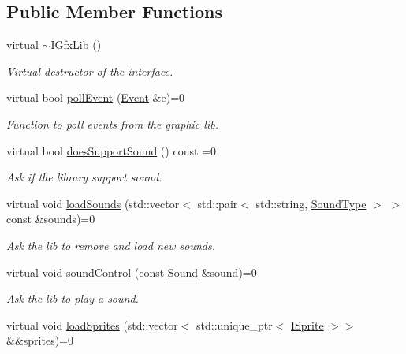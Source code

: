 \subsection*{Public Member Functions}
\begin{DoxyCompactItemize}
\item 
virtual \hyperlink{classarcade_1_1_i_gfx_lib_a1dc0971c862d69be60af1d3b82960c77}{$\sim$\+I\+Gfx\+Lib} ()
\begin{DoxyCompactList}\small\item\em Virtual destructor of the interface. \end{DoxyCompactList}\item 
virtual bool \hyperlink{classarcade_1_1_i_gfx_lib_a82cdd82f168ca898ef81edf82ca6147a}{poll\+Event} (\hyperlink{structarcade_1_1_event}{Event} \&e)=0
\begin{DoxyCompactList}\small\item\em Function to poll events from the graphic lib. \end{DoxyCompactList}\item 
virtual bool \hyperlink{classarcade_1_1_i_gfx_lib_a68cfbc987dfecca5b1405e36e00157b2}{does\+Support\+Sound} () const =0
\begin{DoxyCompactList}\small\item\em Ask if the library support sound. \end{DoxyCompactList}\item 
virtual void \hyperlink{classarcade_1_1_i_gfx_lib_a725faf0722d284d15eb389b0a1891a27}{load\+Sounds} (std\+::vector$<$ std\+::pair$<$ std\+::string, \hyperlink{namespacearcade_a3bb4743a2eea59f3927e404e6549cae5}{Sound\+Type} $>$ $>$ const \&sounds)=0
\begin{DoxyCompactList}\small\item\em Ask the lib to remove and load new sounds. \end{DoxyCompactList}\item 
virtual void \hyperlink{classarcade_1_1_i_gfx_lib_a0b965ed555739ef366b27583799d794c}{sound\+Control} (const \hyperlink{structarcade_1_1_sound}{Sound} \&sound)=0
\begin{DoxyCompactList}\small\item\em Ask the lib to play a sound. \end{DoxyCompactList}\item 
virtual void \hyperlink{classarcade_1_1_i_gfx_lib_ad5b301c8ff56c428971a2a006514b709}{load\+Sprites} (std\+::vector$<$ std\+::unique\+\_\+ptr$<$ \hyperlink{classarcade_1_1_i_sprite}{I\+Sprite} $>$$>$ \&\&sprites)=0
$$
\end{DoxyCompactItemize}
